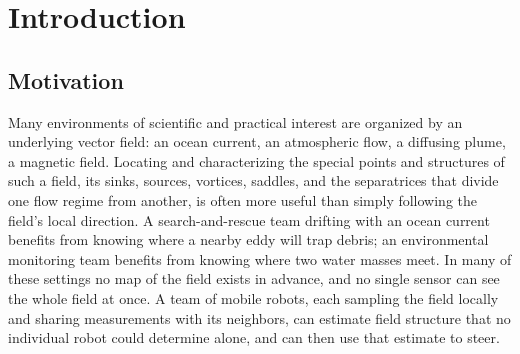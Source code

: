 \documentclass[12pt, letterpaper, oneside]{report}
\begin{document}
\clearpage

\tableofcontents
\clearpage

\listoffigures
{}
\clearpage

\listoftables
{}
\clearpage

\setcounter{page}{1}
\doublespacing

\chapter{Introduction}
\label{ch:intro}

\section{Motivation}

Many environments of scientific and practical interest are organized by an
underlying vector field: an ocean current, an atmospheric flow, a diffusing
plume, a magnetic field. Locating and characterizing the special points and
structures of such a field, its sinks, sources, vortices, saddles, and the
separatrices that divide one flow regime from another, is often more useful
than simply following the field's local direction. A search-and-rescue team
drifting with an ocean current benefits from knowing where a nearby eddy will
trap debris; an environmental monitoring team benefits from knowing where two
water masses meet. In many of these settings no map of the field exists in
advance, and no single sensor can see the whole field at once. A team of
mobile robots, each sampling the field locally and sharing measurements with
its neighbors, can estimate field structure that no individual robot could
determine alone, and can then use that estimate to steer.
\end{document}
